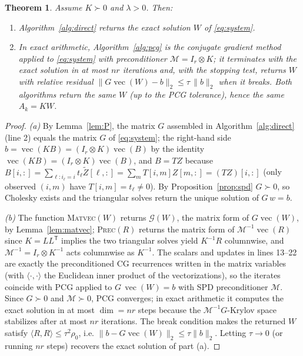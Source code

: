 \documentclass[12pt]{article}
\DeclareMathOperator{\vecop}{vec}
\newtheorem{theorem}{Theorem}
\begin{document}
\begin{theorem}\label{thm:correct}
Assume $K\succ0$ and $\lambda>0$. Then:
\begin{enumerate}[label=(\alph*)]
\item Algorithm~\ref{alg:direct} returns the exact solution $W$ of
\eqref{eq:system}.
\item In exact arithmetic, Algorithm~\ref{alg:pcg} is the conjugate gradient
method applied to \eqref{eq:system} with preconditioner $\mathcal M=I_r\otimes K$;
it terminates with the exact solution in at most $nr$ iterations and, with the
stopping test, returns $W$ with relative residual $\|G\vecop(W)-b\|_2\le
\tau\,\|b\|_2$ when it breaks. Both algorithms return the same $W$ (up to the
PCG tolerance), hence the same $A_k=KW$.
\end{enumerate}
\end{theorem}

\begin{proof}
\emph{(a)} By Lemma~\ref{lem:P}, the matrix $G$ assembled in
Algorithm~\ref{alg:direct} (line 2) equals the matrix $G$ of \eqref{eq:system};
the right-hand side $b=\vecop(KB)=(I_r\otimes K)\vecop(B)$ by the identity
$\vecop(KB)=(I_r\otimes K)\vecop(B)$, and $B=TZ$ because
$B[i,:]=\sum_{\ell:i_\ell=i}t_\ell\tilde Z[\ell,:]=\sum_m T[i,m]Z[m,:]=(TZ)[i,:]$
(only observed $(i,m)$ have $T[i,m]=t_\ell\neq0$). By Proposition~\ref{prop:spd}
$G\succ0$, so Cholesky exists and the triangular solves return the unique
solution of $G\,w=b$.

\emph{(b)} The function \textsc{Matvec}$(W)$ returns $\mathcal G(W)$, the matrix
form of $G\vecop(W)$, by Lemma~\ref{lem:matvec}; \textsc{Prec}$(R)$ returns the
matrix form of $\mathcal M^{-1}\vecop(R)$ since $K=LL^{\mathsf T}$ implies the two
triangular solves yield $K^{-1}R$ columnwise, and $\mathcal M^{-1}=I_r\otimes
K^{-1}$ acts columnwise as $K^{-1}$. The scalars and updates in lines 13--22 are
exactly the preconditioned CG recurrences written in the matrix variables (with
$\langle\cdot,\cdot\rangle$ the Euclidean inner product of the vectorizations),
so the iterates coincide with PCG applied to $G\,\vecop(W)=b$ with SPD
preconditioner $\mathcal M$. Since $G\succ0$ and $\mathcal M\succ0$, PCG
converges; in exact arithmetic it computes the exact solution in at most
$\dim=nr$ steps because the $\mathcal M^{-1}G$-Krylov space stabilizes after at
most $nr$ iterations. The break condition makes the returned $W$ satisfy
$\langle R,R\rangle\le\tau^2\rho_0$, i.e. $\|b-G\vecop(W)\|_2\le\tau\|b\|_2$.
Letting $\tau\to0$ (or running $nr$ steps) recovers the exact solution of part
(a).
\end{proof}
\end{document}
